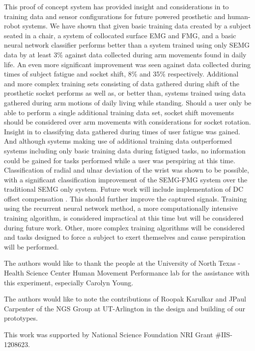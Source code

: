 \documentclass[twocolumn]{sagej}
\begin{document}
This proof of concept system has provided insight and considerations in to training data and sensor configurations for future powered prosthetic and human-robot systems.  We have shown that given basic training data created by a subject seated in a chair, a system of collocated surface EMG and FMG, and a basic neural network classifier performs better than a system trained using only SEMG data by at least 3\% against data collected during arm movements found in daily life. An even more significant improvement was seen against data collected during times of subject fatigue and socket shift, 8\% and 35\% respectively.  Additional and more complex training sets consisting of data gathered during shift of the prosthetic socket performs as well as, or better than, systems trained using data gathered during arm motions of daily living while standing.  Should a user only be able to perform a single additional training data set, socket shift movements should be considered over arm movements with considerations for socket rotation.  Insight in to classifying data gathered during times of user fatigue was gained. And although systems making use of additional training data outperformed systems including only basic training data during fatigued tasks, no information could be gained for tasks performed while a user was perspiring at this time. Classification of radial and ulnar deviation of the wrist was shown to be possible, with a significant classification improvement of the SEMG-FMG system over the traditional SEMG only system. Future work will include implementation of DC offset compensation \cite{Tomasini2015}. This should further improve the captured signals.  Training using the recurrent neural network method, a more computationally intensive training algorithm, is considered impractical at this time but will be considered during future work.  Other, more complex training algorithms will be considered and tasks designed to force a subject to exert themselves and cause perspiration will be performed.

\begin{acks}
\label{sec:acknowledgments}
The authors would like to thank the people at the University of North Texas - Health Science Center Human Movement Performance lab for the assistance with this experiment, especially Carolyn Young.  \par 
The authors would like to note the contributions of Roopak Karulkar and JPaul Carpenter of the NGS Group at UT-Arlington in the design and building of our prototypes.
\end{acks}

\begin{funding}
This work was supported by National Science Foundation NRI Grant $\#$IIS-1208623.
\end{funding}



%
%


\end{document}
